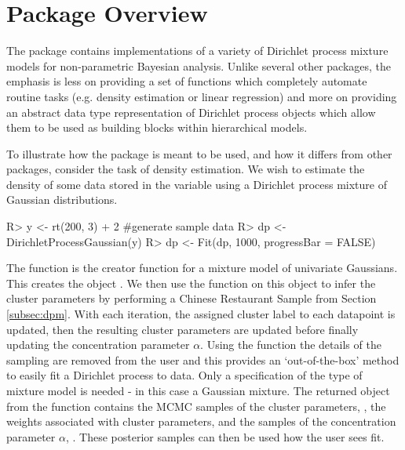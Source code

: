 \documentclass[nojss]{jss}
\begin{document}
\section{Package Overview}
\label{sec:package}

The  package contains implementations of a variety of Dirichlet process mixture models for non-parametric Bayesian analysis. Unlike several other  packages, the emphasis is less on providing a set of functions which completely automate routine tasks (e.g. density estimation or linear regression) and more on providing an abstract data type representation of Dirichlet process objects which allow them to be used as building blocks within hierarchical models.

To illustrate how the package is meant to be used, and how it differs from other  packages, consider the task of density estimation. We wish to estimate the density of some data stored in the variable  using a Dirichlet process mixture of Gaussian distributions.

\begin{Schunk}
\begin{Sinput}
R> y <- rt(200, 3) + 2 #generate sample data
R> dp <- DirichletProcessGaussian(y)
R> dp <- Fit(dp, 1000, progressBar = FALSE)
\end{Sinput}
\end{Schunk}

The function  is the creator function for a mixture model of univariate Gaussians. This creates the object . We then use the function  on this object to infer the cluster parameters by performing a Chinese Restaurant Sample from Section \ref{subsec:dpm}. With each iteration, the assigned cluster label to each datapoint is updated, then the resulting cluster parameters are updated before finally updating the concentration parameter $\alpha$. Using the  function the details of the sampling are removed from the user and this provides an `out-of-the-box' method to easily fit a Dirichlet process to data. Only a specification of the type of mixture model is needed - in this case a Gaussian mixture. The returned object  from the  function contains the MCMC samples of the cluster parameters, , the weights associated with cluster parameters,  and the samples of the concentration parameter $\alpha$, . These posterior samples can then be used how the user sees fit.
\end{document}
